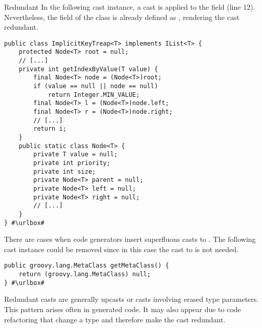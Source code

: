 \begin{pattern}{Redundant}
In the following cast instance,
a cast is applied to the  field (line 12).
Nevertheless, the  field of the  class is already defined as ,
rendering the cast redundant.

\def\urlvar{http://bit.ly/phishman3579_java_algorithms_implementation_2SGcH6w}
\begin{verbatim}
public class ImplicitKeyTreap<T> implements IList<T> {
    protected Node<T> root = null; 
    // [...] 
    private int getIndexByValue(T value) {
        final Node<T> node = (Node<T>)root;
        if (value == null || node == null)
            return Integer.MIN_VALUE;
        final Node<T> l = (Node<T>)node.left;
        final Node<T> r = (Node<T>)node.right;
        // [...]
        return i;
    }
    public static class Node<T> {
        private T value = null;
        private int priority;
        private int size;
        private Node<T> parent = null;
        private Node<T> left = null;
        private Node<T> right = null;
        // [...]
    }
} #\urlbox#
\end{verbatim}

There are cases when code generators insert superfluous casts to .
The following cast instance could be removed since in this case the cast to  is not needed.

\def\urlvar{http://bit.ly/togglz_togglz_2SGncXB}
\begin{verbatim}
public groovy.lang.MetaClass getMetaClass() {
    return (groovy.lang.MetaClass) null;
} #\urlbox#
\end{verbatim}


\issues{}
Redundant casts are generally upcasts or casts involving erased type parameters.
This pattern arises often in generated code.
It may also appear due to code refactoring that change a type and therefore make the cast redundant.
    
\end{pattern}
